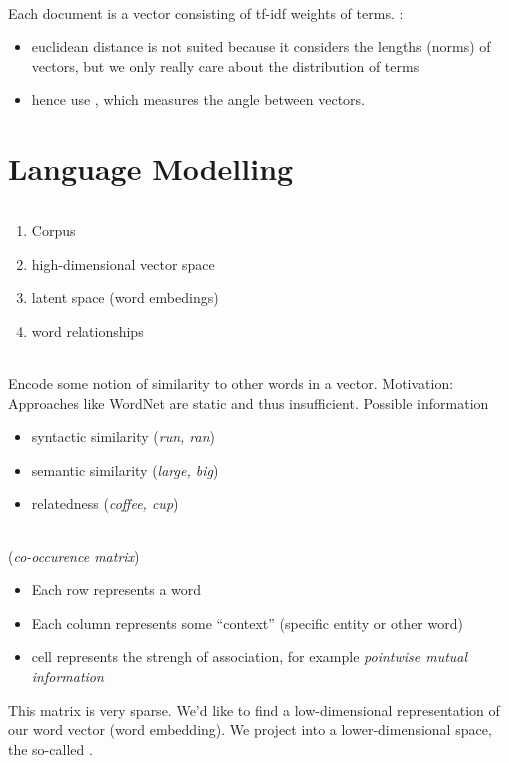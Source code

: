 \documentclass[10pt,twocolumn]{article}
\begin{document}
\paragraph{} Each document is a vector consisting of
tf-idf weights of terms. :
\begin{itemize}
\item euclidean distance is not suited because it considers the lengths (norms)
  of vectors, but we only really care about the distribution of terms
\item hence use , which measures the angle between vectors.
\end{itemize}


\pagebreak
\part{Language Modelling}

\paragraph{}
\begin{enumerate}
\item Corpus
\item high-dimensional vector space
\item latent space (word embedings)
\item word relationships
\end{enumerate}


\paragraph{} Encode some notion of similarity to other words
in a vector. Motivation: Approaches like WordNet are static and thus
insufficient. Possible information
\begin{itemize}
\item syntactic similarity (\textit{run, ran})
\item semantic similarity (\textit{large, big})
\item relatedness (\textit{coffee, cup})
\end{itemize}

\paragraph{} (\textit{co-occurence matrix})
\begin{itemize}
\item Each row represents a word
\item Each column represents some ``context'' (specific entity or other word)
\item cell represents the strengh of association, for example \textit{pointwise
    mutual information}
\end{itemize}
This matrix is very sparse. We'd like to find a low-dimensional
representation of our word vector (word embedding). We project into a
lower-dimensional space, the so-called .
\end{document}
